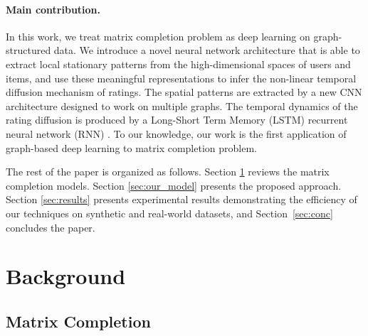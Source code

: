 \documentclass{article}
\begin{document}
\paragraph*{Main contribution.} In this work, we treat matrix completion problem as deep learning on graph-structured data. 
We introduce a novel neural network architecture that is able to extract local stationary patterns from the high-dimensional spaces of users and items, and use these meaningful representations to infer the non-linear temporal diffusion mechanism of ratings. 
The spatial patterns are extracted by a new CNN architecture designed to work on multiple graphs. The temporal dynamics of the rating diffusion is produced by a Long-Short Term Memory (LSTM) recurrent neural network (RNN) \cite{art:HochreiterSchmidhuber97LSTM}. 
To our knowledge, our work is the first application of graph-based deep learning to matrix completion problem. 


The rest of the paper is organized as follows. 
Section \ref{sec:rev} reviews the matrix completion models. Section \ref{sec:our_model} presents the proposed approach. Section \ref{sec:results} presents experimental results demonstrating the efficiency of our techniques on synthetic and real-world datasets, and Section~\ref{sec:conc} concludes the paper. 










 	



\section{Background}
\label{sec:rev}

\subsection{Matrix Completion}
\end{document}
